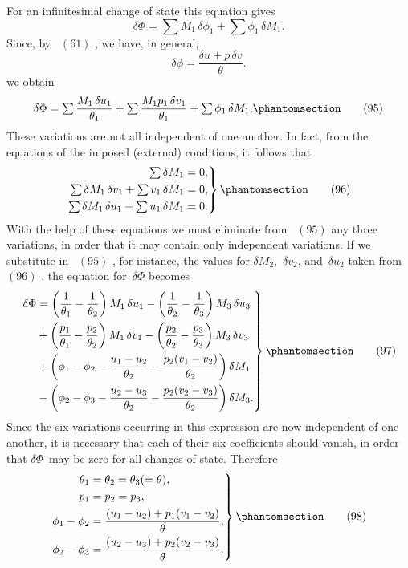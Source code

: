 \documentclass[12pt]{book}[2005/09/16]
\newcommand{\Chg}[2]{#2}
\newcommand{\Add}[1]{\Chg{}{#1}}
\newcommand{\Tag}[1]{%
  \phantomsection\label{eqn:#1}\tag*{\ensuremath{#1}}%
}
\newcommand{\Eq}[1]{%
  \hyperref[eqn:#1]{\ensuremath{#1}}%
}
\newcommand{\PageSep}[1]{\ignorespaces}
\newcommand{\tsum}{\mathop{\textstyle\sum}\limits}
\begin{document}
For an infinitesimal change of state this equation gives
\[
\delta \Phi = \tsum M_{1}\, \delta \phi_{1} + \tsum \phi_{1}\, \delta M_{1}.
\]
Since, by~\Eq{(61)}, we have, in general,
\[
\delta \phi = \frac{\delta u + p\, \delta v}{\theta}.
\]
we obtain
\[
\delta \Phi = \tsum \frac{M_{1}\, \delta u_{1}}{\theta_{1}}
  + \tsum \frac{M_{1}p_{1}\, \delta v_{1}}{\theta_{1}}
  + \tsum \phi_{1}\, \delta M_{1}\Add{.}
\Tag{(95)}
\]
These variations are not all independent of one another.
In fact, from the equations of the imposed (external) conditions,
it follows that
\[
\left.
\begin{aligned}
\tsum \delta M_{1} &= 0\Add{,} \\
\tsum \delta M_{1}\, \delta v_{1} + \tsum v_{1}\, \delta M_{1} &= 0\Add{,} \\
\tsum \delta M_{1}\, \delta u_{1} + \tsum u_{1}\, \delta M_{1} &= 0\Add{.} \\
\end{aligned}
\right\}
\Tag{(96)}
\]
With the help of these equations we must eliminate
from~\Eq{(95)} any three variations, in order that it may contain
only independent variations. If we substitute in~\Eq{(95)}, for
instance, the values for $\delta M_{2}$,~$\delta v_{2}$, and~$\delta u_{2}$ taken from~\Eq{(96)}, the
equation for~$\delta \Phi$ becomes
\[
\left.
\begin{aligned}
\delta \Phi
  &= \left(\frac{1}{\theta_{1}} - \frac{1}{\theta_{2}}\right) M_{1}\, \delta u_{1}
   - \left(\frac{1}{\theta_{2}} - \frac{1}{\theta_{3}}\right) M_{3}\, \delta u_{3} \\
  &+ \left(\frac{p_{1}}{\theta_{1}} - \frac{p_{2}}{\theta_{2}}\right) M_{1}\, \delta v_{1}
   - \left(\frac{p_{2}}{\theta_{2}} - \frac{p_{3}}{\theta_{3}}\right) M_{3}\, \delta v_{3} \\
  &+ \left(\phi_{1} - \phi_{2} - \frac{u_{1} - u_{2}}{\theta_{2}} - \frac{p_{2}(v_{1} - v_{2})}{\theta_{2}}\right) \delta M_{1} \\
  &- \left(\phi_{2} - \phi_{3} - \frac{u_{2} - u_{3}}{\theta_{2}} - \frac{p_{2}(v_{2} - v_{3})}{\theta_{2}}\right) \delta M_{3}\Add{.} \\
\end{aligned}
\right\}
\Tag{(97)}
\]
\PageSep{135}
Since the six variations occurring in this expression are
now independent of one another, it is necessary that each of
their six coefficients should vanish, in order that $\delta \Phi$~may be
zero for all changes of state. Therefore
\[
\left.
\begin{aligned}
\theta_{1} &= \theta_{2} = \theta_{3} (= \theta)\Add{,} \\
p_{1} &= p_{2} = p_{3}\Add{,} \\
\phi_{1} - \phi_{2} &= \frac{(u_{1} - u_{2}) + p_{1}(v_{1} - v_{2})}{\theta}\Add{,} \\
\phi_{2} - \phi_{3} &= \frac{(u_{2} - u_{3}) + p_{2}(v_{2} - v_{3})}{\theta}\Add{.} \\
\end{aligned}
\right\}
\Tag{(98)}
\]
\end{document}
